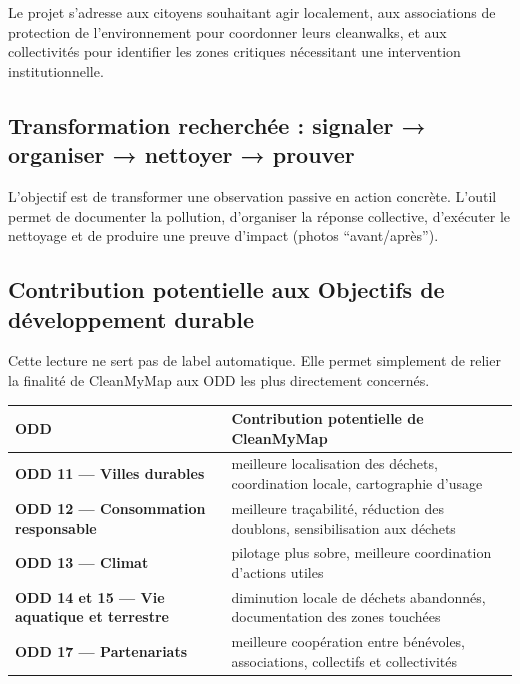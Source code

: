 \documentclass[
  10pt,
  a4paper,
  DIV=11,
  numbers=noendperiod,
  oneside]{scrreprt}
\newcounter{none} %
\let\oldtextbf\textbf
\renewcommand{\textbf}[1]{\oldtextbf{\textcolor{cmmnavy}{#1}}}
\begin{document}
Le projet s'adresse aux citoyens souhaitant agir localement, aux
associations de protection de l'environnement pour coordonner leurs
cleanwalks, et aux collectivités pour identifier les zones critiques
nécessitant une intervention institutionnelle.

\subsection{Transformation recherchée : signaler → organiser → nettoyer
→
prouver}\label{transformation-recherchuxe9e-signaler-organiser-nettoyer-prouver}

L'objectif est de transformer une observation passive en action
concrète. L'outil permet de documenter la pollution, d'organiser la
réponse collective, d'exécuter le nettoyage et de produire une preuve
d'impact (photos ``avant/après'').

\subsection{Contribution potentielle aux Objectifs de développement
durable}\label{contribution-potentielle-aux-objectifs-de-duxe9veloppement-durable}

Cette lecture ne sert pas de label automatique. Elle permet simplement
de relier la finalité de CleanMyMap aux ODD les plus directement
concernés.

{\def\LTcaptype{none} %
\begin{longtable}[]{@{}
  >{\raggedright\arraybackslash}p{}
  >{\raggedright\arraybackslash}p{}@{}}
\toprule\noalign{}
\begin{minipage}[b]{\linewidth}\raggedright
ODD
\end{minipage} & \begin{minipage}[b]{\linewidth}\raggedright
Contribution potentielle de CleanMyMap
\end{minipage} \\
\midrule\noalign{}
\endhead
\bottomrule\noalign{}
\endlastfoot
\textbf{ODD 11 --- Villes durables} & meilleure localisation des
déchets, coordination locale, cartographie d'usage \\
\textbf{ODD 12 --- Consommation responsable} & meilleure traçabilité,
réduction des doublons, sensibilisation aux déchets \\
\textbf{ODD 13 --- Climat} & pilotage plus sobre, meilleure coordination
d'actions utiles \\
\textbf{ODD 14 et 15 --- Vie aquatique et terrestre} & diminution locale
de déchets abandonnés, documentation des zones touchées \\
\textbf{ODD 17 --- Partenariats} & meilleure coopération entre
bénévoles, associations, collectifs et collectivités \\
\end{longtable}
}
\end{document}

